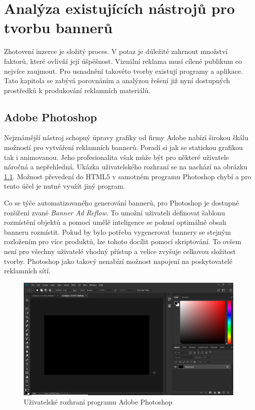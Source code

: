 \chapter{Analýza existujících nástrojů pro tvorbu bannerů}
\label{chap:analysis}
Zhotovení inzerce je složitý proces. V potaz je důležité zahrnout množství faktorů, které ovlivňí její úšpěšnost. Vizuální reklama musí cílené publikum co nejvíce zaujmout.
Pro usnadnění takovéto tvorby existují programy a aplikace. Tato kapitola se zabývá porovnáním a analýzou řešení již nyní dostupných prostředků k produkování reklamních materiálů.

\section{Adobe Photoshop}
Nejznámější nástroj schopný úpravy grafiky od firmy Adobe nabízí širokou škálu možností pro vytváření reklamních bannerů.
Poradí si jak se statickou grafikou tak i animovanou. Jeho profesionalita však může být pro některé uživatele náročná a nepřehledná. 
Ukázka uživatelského rozhraní se na nachází na obrázku \ref{fig:photoshop}.
Možnost převedení do HTML5 v samotném programu Photoshop chybí a pro tento účel je nutné využít jiný program.

Co se týče automatizovaného generování bannerů, pro Photoshop je dostupné rozšíření zvané \emph{Banner Ad Reflow}.
To umožní uživateli definovat šablonu rozmístění objektů a pomocí umělé inteligence se pokusí optimálně obsah banneru rozmístit.
Pokud by bylo potřeba vygenerovat bannery se stejným rozložením pro více produktů, lze tohoto docílit pomocí skriptování.
To ovšem není pro všechny uživatelé vhodný přístup a velice zvyšuje celkovou složitost tvorby. Photoshop jako takový nenabízí možnost napojení na poskytovatelé reklamních sítí.
\begin{figure}
    \centering
    \includegraphics[width=.8\textwidth]{Figures/adobe-photoshop.png}
    \caption[Adobe Photostop]{Uživatelské rozhraní programu Adobe Photoshop}
    \label{fig:photoshop}
\end{figure}

